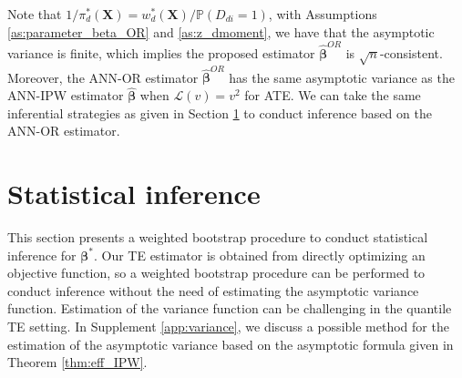 \documentclass[11pt]{article}
\numberwithin{equation}{section}
\begin{document}
Note that $1/\pi_d^*(\boldsymbol{X})=w^*_d(\boldsymbol{X})/\mathbb{P}(D_{di}=1)$, with Assumptions \ref{as:parameter_beta_OR} and  \ref{as:z_dmoment}, we  have that the asymptotic variance is finite, which implies the proposed estimator $\widehat{\boldsymbol{\beta}}^{OR}$ is $\sqrt{n}$-consistent.  Moreover, the ANN-OR estimator $\widehat{\boldsymbol{\beta}}^{OR}$ has the same asymptotic variance as the ANN-IPW estimator  $\widehat{\boldsymbol{\beta}}$ when $\mathcal{L}(v)=v^2$ for ATE. We can take the same inferential strategies as given in Section \ref{sec:variance} to conduct inference based on the ANN-OR estimator.




\section{Statistical inference}\label{sec:variance}
This section presents a weighted bootstrap procedure  to conduct statistical inference for $\boldsymbol{\beta}^*$. Our TE estimator is obtained from directly optimizing an objective function, so a weighted bootstrap procedure can be performed to conduct inference without the need of estimating the asymptotic variance function. Estimation of the variance function can be challenging in the quantile TE setting. In Supplement \ref{app:variance}, we discuss a possible method for the estimation of the asymptotic variance based on the asymptotic formula given in Theorem \ref{thm:eff_IPW}.
\end{document}
